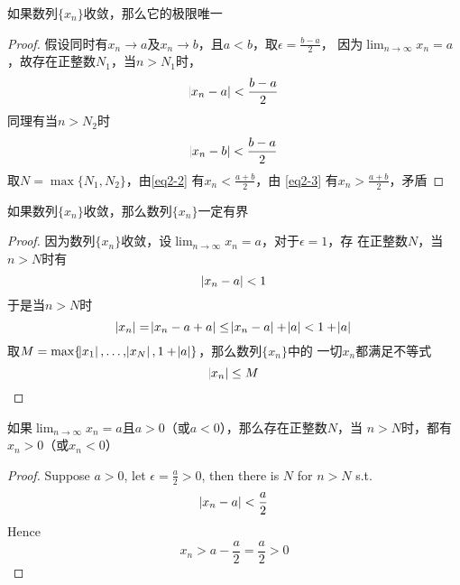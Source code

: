 \documentclass[11pt]{article}
\begin{document}
\begin{theorem}[极限的唯一性]
如果数列\(\{x_n\}\)收敛，那么它的极限唯一
\end{theorem}

\begin{proof}
假设同时有\(x_n\to a\)及\(x_n\to b\)，且\(a<b\)，取\(\epsilon=\frac{b-a}{2}\)，
因为\(\lim_{n\to\infty}x_n=a\)，故存在正整数\(N_1\)，当\(n>N_1\)时，
\begin{equation}
\abs{x_n-a}<\frac{b-a}{2}\label{eq2-2}
\end{equation}
同理有当\(n>N_2\)时
\begin{equation}
\abs{x_n-b}<\frac{b-a}{2}\label{eq2-3}
\end{equation}
取\(N=\max\{N_1,N_2\}\)，由\eqref{eq2-2} 有\(x_n<\frac{a+b}{2}\)，由
\eqref{eq2-3} 有\(x_n>\frac{a+b}{2}\)，矛盾
\end{proof}

\begin{theorem}[收敛数列的有界性]
如果数列\(\{x_n\}\)收敛，那么数列\(\{x_n\}\)一定有界
\end{theorem}

\begin{proof}
因为数列\(\{x_n\}\)收敛，设\(\lim_{n\to\infty}x_n=a\)，对于\(\epsilon=1\)，存
在正整数\(N\)，当\(n>N\)时有
\begin{equation*}
\abs{x_n-a}<1
\end{equation*}
于是当\(n>N\)时
\begin{equation*}
\abs{x_n}=\abs{x_n-a+a}\le\abs{x_n-a}+\abs{a}<1+\abs{a}
\end{equation*}
取\(M=\max\{\abs{x_1},\dots,\abs{x_N},1+\abs{a}\}\)，那么数列\(\{x_n\}\)中的
一切\(x_n\)都满足不等式
\begin{equation*}
\abs{x_n}\le M
\end{equation*}
\end{proof}

\begin{theorem}[收敛数列的保号性]
如果\(\lim_{n\to\infty}x_n=a\)且\(a>0\)（或\(a<0\)），那么存在正整数\(N\)，当
\(n>N\)时，都有\(x_n>0\)（或\(x_n<0\)）
\end{theorem}

\begin{proof}
Suppose \(a>0\), let \(\epsilon=\frac{a}{2}>0\), then there is \(N\) for
\(n>N\) s.t.
\begin{equation*}
\abs{x_n-a}<\frac{a}{2}
\end{equation*}
Hence
\begin{equation*}
x_n>a-\frac{a}{2}=\frac{a}{2}>0
\end{equation*}
\end{proof}
\end{document}
